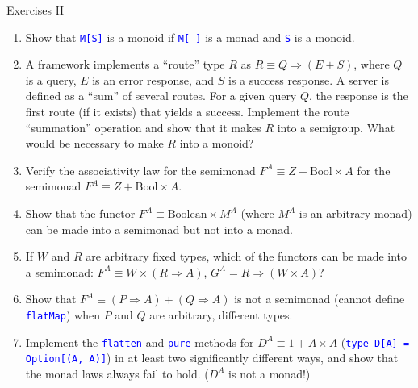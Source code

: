 \documentclass[english]{beamer}
\begin{document}
\begin{frame}{Exercises II}
\begin{enumerate}
\item \vspace*{-0.2cm}Show that \texttt{\textcolor{blue}{\footnotesize{}M{[}S{]}}}
is a monoid if \texttt{\textcolor{blue}{\footnotesize{}M{[}\_{]}}}
is a monad and \texttt{\textcolor{blue}{\footnotesize{}S}} is a monoid.
\item A framework implements a ``route'' type $R$ as $R\equiv Q\Rightarrow\left(E+S\right)$,
where $Q$ is a query, $E$ is an error response, and $S$ is a success
response. A server is defined as a ``sum'' of several routes. For
a given query $Q$, the response is the first route (if it exists)
that yields a success. Implement the route ``summation'' operation
and show that it makes $R$ into a semigroup. What would be necessary
to make $R$ into a monoid?
\item Verify the associativity law for the semimonad $F^{A}\equiv Z+\text{Bool}\times A$ for the semimonad $F^{A}\equiv Z+\text{Bool}\times A$.
\item Show that the functor $F^{A}\equiv\text{Boolean}\times M^{A}$ (where
$M^{A}$ is an arbitrary monad) can be made into a semimonad but not
into a monad.
\item If $W$ and $R$ are arbitrary fixed types, which of the functors
can be made into a semimonad: $F^{A}\equiv W\times\left(R\Rightarrow A\right)$,
$G^{A}=R\Rightarrow\left(W\times A\right)$?
\item Show that $F^{A}\equiv\left(P\Rightarrow A\right)+\left(Q\Rightarrow A\right)$
is not a semimonad (cannot define \texttt{\textcolor{blue}{\footnotesize{}flatMap}})
when $P$ and $Q$ are arbitrary, different types.
\item Implement the \texttt{\textcolor{blue}{\footnotesize{}flatten}} and
\texttt{\textcolor{blue}{\footnotesize{}pure}} methods for $D^{A}\equiv1+A\times A$
(\texttt{\textcolor{blue}{\footnotesize{}type D{[}A{]} = Option{[}(A,
A){]}}}) in at least two significantly different ways, and show that
the monad laws always fail to hold. ($D^{A}$ is not a monad!)
\end{enumerate}
\end{frame}
\end{document}
